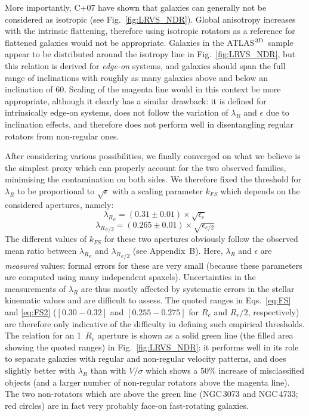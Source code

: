 \documentclass[useAMS,usenatbib,usegraphicx]{mn2e}
\newcommand{\atlas}{{ATLAS$^{\rm 3D}$}}
\begin{document}
More importantly, C+07 have shown that galaxies can generally not
be considered as isotropic (see Fig.~\ref{fig:LRVS_NDR}). Global anisotropy increases with the
intrinsic flattening, therefore using isotropic rotators as a reference for
flattened galaxies would not be appropriate. Galaxies in the \atlas\ sample appear
to be distributed around the isotropy line in Fig.~\ref{fig:LRVS_NDR}, but
this relation is derived for {\em edge-on} systems, and galaxies 
should span the full range of inclinations with roughly as
many galaxies above and below an inclination of 60\degr. 
Scaling of the magenta line would in this context
be more appropriate, although it clearly has a similar drawback: it is defined
for intrinsically edge-on systems, does not follow the variation of $\lambda_R$
and $\epsilon$ due to inclination effects, and therefore does not perform well in disentangling regular rotators
from non-regular ones.

After considering various possibilities, we finally converged on what we
believe is the simplest proxy which can properly account for the two observed families, minimising the
contamination on both sides. We therefore fixed the threshold for $\lambda_R$
to be proportional to $\sqrt{\epsilon}$ with a scaling parameter $k_{FS}$ which depends
on the considered apertures, namely:
\begin{equation}
   \label{eq:FS}
   {\lambda_R}_e = \left( 0.31 \pm 0.01 \right) \times \sqrt{\epsilon_e} 
\end{equation}
\begin{equation}
   \label{eq:FS2}
   {\lambda_R}_{e/2} = \left( 0.265 \pm 0.01\right)   \times \sqrt{\epsilon_{e/2}}
\end{equation}
The different values of $k_{FS}$ for these two apertures obviously follow the observed 
mean ratio between ${\lambda_R}_e$ and ${\lambda_R}_{e/2}$ (see
Appendix~B). Here, $\lambda_R$ and $\epsilon$ are {\em measured} values:
formal errors for these are very small (because these
parameters are computed using many independent spaxels). 
Uncertainties in the measurements of $\lambda_R$ are thus mostly affected by systematic errors
in the stellar kinematic values and are difficult to assess. 
The quoted ranges in Eqs.~\ref{eq:FS} and \ref{eq:FS2} ($[0.30-0.32]$ and $[0.255-0.275]$ for 
$R_e$ and $R_e/2$, respectively) are therefore only indicative of the difficulty
in defining such empirical thresholds.
The relation for an 1~$R_e$ aperture is shown as a solid green line (the filled area showing the
quoted ranges) in Fig.~\ref{fig:LRVS_NDR}: 
it performs well in its role to separate galaxies with regular and non-regular velocity patterns,
and does slightly better with $\lambda_R$ than with $V/\sigma$ which shows a 50\% increase of misclassified objects 
(and a larger number of non-regular rotators above the magenta line).
The two non-rotators which are above the green line (NGC\,3073 and NGC\,4733; red circles)
are in fact very probably face-on fast-rotating galaxies. 
\end{document}
